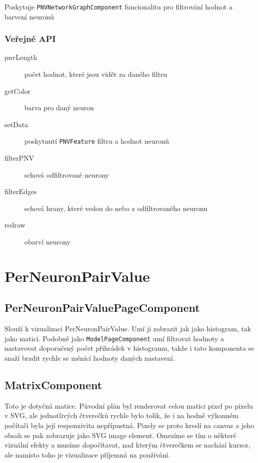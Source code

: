 Poskytuje \lstinline|PNVNetworkGraphComponent| funcionalitu pro filtrování hodnot a barvení neuronů

\subsubsection*{Veřejné API}

\begin{description}
  \item[pnvLength] počet hodnot, které jsou vidět za daného filtru
  \item[getColor] barva pro daný neuron
  \item[setData] poskytnutí \lstinline|PNVFeature| filtru a hodnot neuronů
  \item[filterPNV] schová odfiltrované neurony
  \item[filterEdges] schová hrany, které vedou do nebo z odfiltrovaného neuronu
  \item[redraw] obarví neurony
\end{description}

\section{PerNeuronPairValue}

\subsection{PerNeuronPairValuePageComponent}

Slouží k vizualizaci PerNeuronPairValue. Umí ji zobrazit jak jako histogram, tak jako matici. Podobně jako \lstinline|ModelPageComponent| umí filtrovat hodnoty a nastavovat doporučený počet přihrádek v histogramu, takže i tato komponenta se snaží brzdit rychle se měnící hodnoty daných nastavení.

\subsection{MatrixComponent}

Toto je dotyčná matice. Původní plán byl renderovat celou matici pixel po pixelu v SVG, ale jednotlivých čtverečků rychle bylo tolik, že i na hodně výkonném počítači byla její responzivita nepřípustná. Pixely se proto kreslí na canvas a jeho obsah se pak zobrazuje jako SVG image element. Omezíme se tím o některé vizuální efekty a musíme dopočítavat, nad kterým čtverečkem se nachází kurzor, ale namísto toho je vizualizace příjemná na používání.


